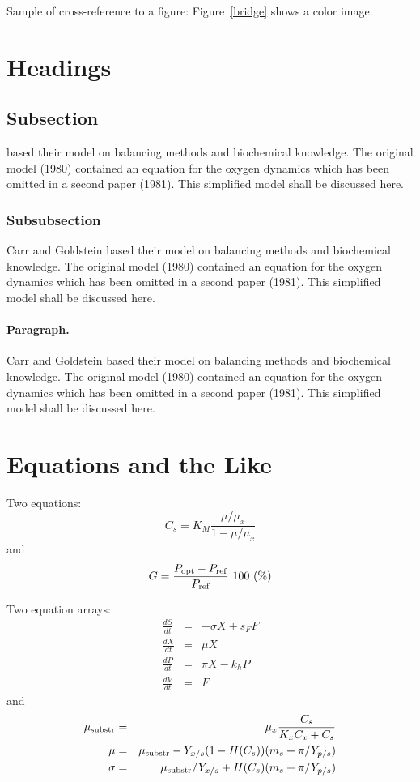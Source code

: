 \documentclass{river-journal}
\begin{document}
Sample of cross-reference to a figure:
Figure~\ref{bridge} shows a color image.

\section{Headings}

\subsection{Subsection}
\cite{Carr-Goldstein,Cohen-Jones88-book}
based their model on balancing methods and biochemical
knowledge. The original model (1980) contained an equation for the
oxygen dynamics which has been omitted in a second paper
(1981). This simplified model shall be discussed here.

\subsubsection{Subsubsection}
Carr and Goldstein \cite{Carr-Goldstein}
based their model on balancing methods and biochemical
knowledge. The original model (1980) contained an equation for the
oxygen dynamics which has been omitted in a second paper
(1981). This simplified model shall be discussed here.

\paragraph{Paragraph.}
Carr and Goldstein \cite{Carr-Goldstein}
based their model on balancing methods and biochemical
knowledge. The original model (1980) contained an equation for the
oxygen dynamics which has been omitted in a second paper
(1981). This simplified model shall be discussed here.

\section{Equations and the Like}

Two equations:
\begin{equation}
    C_{s}  =  K_{M} \frac{\mu/\mu_{x}}{1-\mu/\mu_{x}} \label{ccs}
\end{equation}
and
\begin{equation}
    G = \frac{P_{\rm opt} - P_{\rm ref}}{P_{\rm ref}} \mbox{\ }100 \mbox{\ }(\%)
\end{equation}

Two equation arrays:
\begin{eqnarray}
  \frac{dS}{dt} & = & - \sigma X + s_{F} F\\
  \frac{dX}{dt} & = &   \mu    X\\
  \frac{dP}{dt} & = &   \pi    X - k_{h} P\\
  \frac{dV}{dt} & = &   F
\end{eqnarray}
and
\begin{eqnarray}
 \mu_{\rm substr} & = & \mu_{x} \frac{C_{s}}{K_{x}C_{x}+C_{s}}  \\
 \mu              & = & \mu_{\rm substr} - Y_{x/s}(1-H(C_{s}))(m_{s}+\pi /Y_{p/s}) \\
 \sigma           & = & \mu_{\rm substr}/Y_{x/s}+ H(C_{s}) (m_{s}+ \pi /Y_{p/s})
\end{eqnarray}
\end{document}
